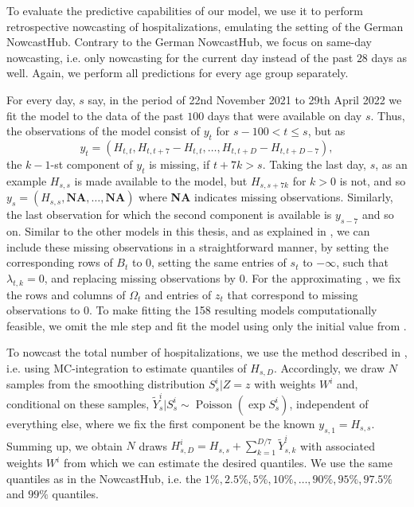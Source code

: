 
To evaluate the predictive capabilities of our model, we use it to perform retrospective nowcasting of hospitalizations, emulating the setting of the German NowcastHub. 
Contrary to the German NowcastHub, we focus on same-day nowcasting, i.e. only nowcasting for the current day instead of the past $28$ days as well. Again, we perform all predictions for every age group separately. 

For every day, $s$ say, in the period of 22nd November 2021 to 29th April 2022 we fit the model to the data of the past $100$ days that were available on day $s$. 
Thus, the observations of the model consist of $y_{t}$ for $s - 100 < t \leq s$, but as 
$$
    y_{t} = \left( H_{t,t}, H_{t, t + 7} - H_{t,t}, \dots, H_{t, t + D}  - H_{t,t + D - 7}\right),
$$
the $k-1$-st component of $y_{t}$ is missing, if $t + 7k > s$. 
Taking the last day, $s$, as an example $H_{s,s}$ is made available to the model, but $H_{s, s+7k}$ for $k > 0$ is not, and so $y_{s} = \left( H_{s,s}, \textbf{NA}, \dots, \textbf{NA} \right)$ where \textbf{NA} indicates missing observations. Similarly, the last observation for which the second component is available is $y_{s - 7}$ and so on. Similar to the other models in this thesis, and as explained in , we can include these missing observations in a straightforward manner, by setting the corresponding rows of $B_{t}$ to $0$, setting the same entries of $s_{t}$ to $-\infty$, such that $\lambda_{t,k} = 0$, and replacing missing observations by $0$. For the approximating , we fix the rows and columns of $\Omega_{t}$ and entries of $z_{t}$ that correspond to missing observations to $0$. To make fitting the 158 resulting models computationally feasible, we omit the \acrshort{mle} step and fit the model using only the initial value from . 

To nowcast the total number of hospitalizations, we use the method described in , i.e. using MC-integration to estimate quantiles of $H_{s, D}$. Accordingly, we draw $N$ samples from the smoothing distribution $S^{i}_{s} | Z = z$ with weights $W^{i}$ and, conditional on these samples, $\tilde Y^{i}_{s} | S^{i}_s \sim \operatorname{Poisson} \left( \exp S^{i}_s \right)$, independent of everything else, where we fix the first component be the known $y_{s,1} = H_{s,s}$. Summing up, we obtain $N$ draws $H^{i}_{s,D} = H_{s,s} + \sum_{k = 1}^{D / 7} \tilde Y^{i}_{s,k}$ with associated weights $W^{i}$ from which we can estimate the desired quantiles. We use the same quantiles as in the NowcastHub, i.e. the $1\%, 2.5\%, 5\%, 10\%, \dots, 90\%, 95\%, 97.5\%$ and $99\%$ quantiles.


